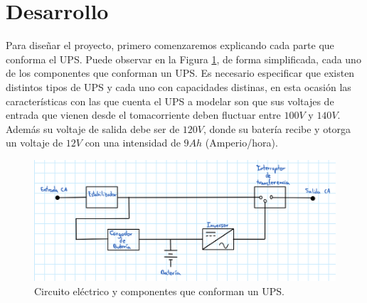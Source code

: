 \documentclass[runningheads]{llncs}
\begin{document}
    \section{Desarrollo}


        Para diseñar el proyecto, primero comenzaremos explicando cada parte que conforma el UPS. Puede observar en la Figura \ref{fig:ups_circuito}, de forma simplificada, cada uno de los componentes que conforman un UPS. Es necesario especificar que existen distintos tipos de UPS y cada uno con capacidades distinas, en esta ocasión las características con las que cuenta el UPS a modelar son que sus voltajes de entrada que vienen desde el tomacorriente deben fluctuar entre $ 100 V $ y $ 140 V $. Además su voltaje de salida debe ser de $ 120 V $, donde su batería recibe y otorga un voltaje de $ 12 V $ con una intensidad de $ 9 Ah $ (Amperio/hora).

        \begin{figure}[H]
            \centering
            \includegraphics[width=\textwidth]{ups_circuito}
            \caption{Circuito eléctrico y componentes que conforman un UPS.}
            \label{fig:ups_circuito}
        \end{figure}
        
\end{document}

